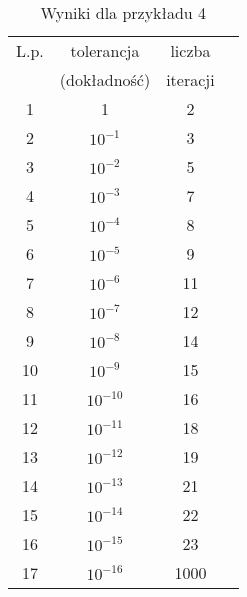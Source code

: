 \documentclass[12pt]{article}
\begin{document}
\begin{table}[H]
\caption{\footnotesize Wyniki dla przykładu 4} %
\renewcommand{\arraystretch}{1.1}
\centering\begin{tabular}{|c|c|c|c|}
\hline L.p. & tolerancja & liczba\\
 & (dokładność) & iteracji\\
\hline 1 & 1 & 2\\
\hline 2 & $10^{-1}$ & 3\\
\hline 3 & $10^{-2}$ & 5\\
\hline 4 & $10^{-3}$ & 7\\
\hline 5 & $10^{-4}$ & 8\\
\hline 6 & $10^{-5}$ & 9\\
\hline 7 & $10^{-6}$ & 11\\
\hline 8 & $10^{-7}$ & 12\\
\hline 9 & $10^{-8}$ & 14\\
\hline 10 & $10^{-9}$ & 15\\
\hline 11 & $10^{-10}$ & 16\\
\hline 12 & $10^{-11}$ & 18\\
\hline 13 & $10^{-12}$ & 19\\
\hline 14 & $10^{-13}$ & 21\\
\hline 15 & $10^{-14}$ & 22\\
\hline 16 & $10^{-15}$ & 23\\
\hline 17 & $10^{-16}$ & 1000\\
\end{tabular}
\end{table}
\end{document}
